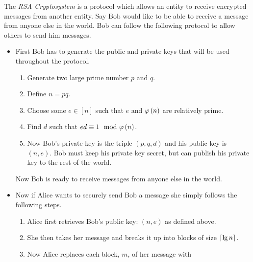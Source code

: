         \begin{definition}
            The \emph{RSA Cryptosystem} is a protocol which allows an entity to receive
            encrypted messages from another entity. Say Bob would like to be able to receive
            a message from anyone else in the world. Bob can follow the following protocol
            to allow others to send him messages.
            \begin{itemize}
                \item
                    First Bob has to generate the public and private keys that will
                    be used throughout the protocol.
                    \begin{enumerate}
                        \item
                            Generate two large prime number $p$ and $q$.
                        \item
                            Define $n = pq$.
                        \item
                            Choose some $e \in [n]$ such that $e$ and $\varphi\left(n\right)$ are
                            relatively prime.
                        \item
                            Find $d$ such that $ed \equiv 1 \mod \eulerphi{n}$.
                        \item 
                            Now Bob's private key is the triple $(p, q, d)$ and his public
                            key is $(n, e)$. Bob must keep his private key secret, but 
                            can publish his private key to the rest of the world.
                    \end{enumerate}
                    Now Bob is ready to receive messages from anyone else in the world.
                \item
                    Now if Alice wants to securely send Bob a message she simply follows 
                    the following steps.
                    \begin{enumerate}
                        \item
                            Alice first retrieves Bob's public key: $(n, e)$ as defined above.
                        \item
                            She then takes her message and breaks it up into blocks of size $\left\lceil \lg n \right\rceil$.
                        \item
                            Now Alice replaces each block, $m$, of her message with

\end{enumerate}
\end{itemize}
\end{definition}

